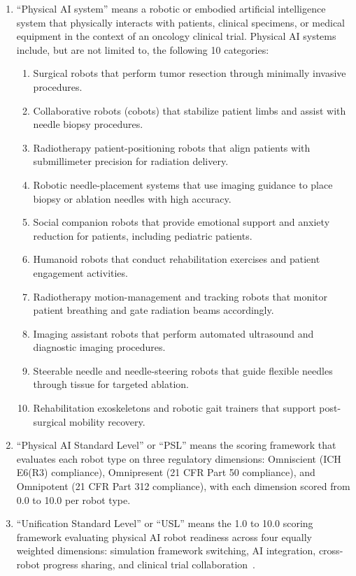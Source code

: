 \documentclass[11pt,letterpaper]{article}
\begin{document}
\begin{enumerate}[label=(\alph*)]
\item ``Physical AI system'' means a robotic or embodied artificial intelligence
  system that physically interacts with patients, clinical specimens, or medical
  equipment in the context of an oncology clinical trial. Physical AI systems
  include, but are not limited to, the following 10 categories:
  \begin{enumerate}[label=(\arabic*)]
  \item Surgical robots that perform tumor resection through minimally invasive
    procedures.
  \item Collaborative robots (cobots) that stabilize patient limbs and assist
    with needle biopsy procedures.
  \item Radiotherapy patient-positioning robots that align patients with
    submillimeter precision for radiation delivery.
  \item Robotic needle-placement systems that use imaging guidance to place
    biopsy or ablation needles with high accuracy.
  \item Social companion robots that provide emotional support and
    anxiety reduction for patients, including pediatric patients.
  \item Humanoid robots that conduct rehabilitation exercises and patient
    engagement activities.
  \item Radiotherapy motion-management and tracking robots that monitor
    patient breathing and gate radiation beams accordingly.
  \item Imaging assistant robots that perform automated ultrasound and
    diagnostic imaging procedures.
  \item Steerable needle and needle-steering robots that guide flexible
    needles through tissue for targeted ablation.
  \item Rehabilitation exoskeletons and robotic gait trainers that support
    post-surgical mobility recovery.
  \end{enumerate}

\item ``Physical AI Standard Level'' or ``PSL'' means the scoring framework
  that evaluates each robot type on three regulatory dimensions: Omniscient
  (ICH E6(R3) compliance), Omnipresent (21 CFR Part 50 compliance), and
  Omnipotent (21 CFR Part 312 compliance), with each dimension scored from
  0.0 to 10.0 per robot type.

\item ``Unification Standard Level'' or ``USL'' means the 1.0 to 10.0
  scoring framework evaluating physical AI robot readiness across four equally
  weighted dimensions: simulation framework switching, AI integration,
  cross-robot progress sharing, and clinical trial
  collaboration~\cite{usl2026}.


\end{enumerate}
\end{document}
